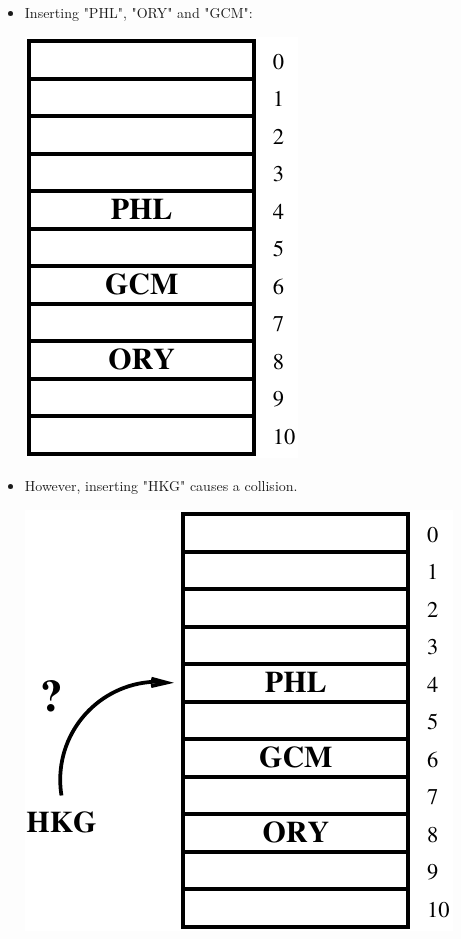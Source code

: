 \begin{frame}[fragile]
\begin{columns}[T]
\pause
\begin{column}{0.55\textwidth}
\begin{itemize}[<+->]
\item Inserting "PHL", "ORY" and "GCM":
\begin{center}
\includegraphics[height=0.33333\textheight]{../Images/hashapt.pdf}
\end{center}
\item However, inserting "HKG" causes a collision.
\begin{center}
\includegraphics[height=0.33333\textheight]{../Images/hashclash.pdf}
\end{center}
\end{itemize}
\end{column}

\end{columns}
\end{frame}

